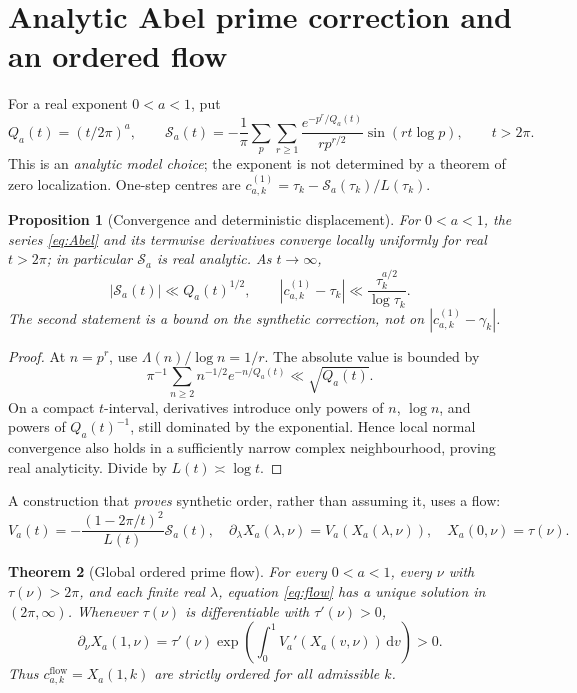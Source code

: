 \documentclass[11pt,a4paper]{article}
\numberwithin{equation}{section}
\newtheorem{theorem}{Theorem}[section]
\newtheorem{proposition}[theorem]{Proposition}
\begin{document}
\section{Analytic Abel prime correction and an ordered flow}
For a real exponent $0<a<1$, put
\begin{equation}\label{eq:Abel}
Q_a(t)=(t/2\pi)^a,\qquad
\mathcal S_a(t)=-\frac1\pi\sum_p\sum_{r\ge1}
\frac{e^{-p^r/Q_a(t)}}{r p^{r/2}}\sin(rt\log p),\qquad t>2\pi.
\end{equation}
This is an \emph{analytic model choice}; the exponent is not determined by a theorem of zero localization. One-step centres are $c_{a,k}^{(1)}=\tau_k-\mathcal S_a(\tau_k)/L(\tau_k)$.
\begin{proposition}[Convergence and deterministic displacement]\label{prop:Abel}
For $0<a<1$, the series \eqref{eq:Abel} and its termwise derivatives converge locally uniformly for real $t>2\pi$; in particular $\mathcal S_a$ is real analytic. As $t\to\infty$,
\begin{equation}\label{eq:Abelbound}
|\mathcal S_a(t)|\ll Q_a(t)^{1/2},\qquad
|c_{a,k}^{(1)}-\tau_k|\ll \frac{\tau_k^{a/2}}{\log\tau_k}.
\end{equation}
The second statement is a bound on the \emph{synthetic correction}, not on $|c_{a,k}^{(1)}-\gamma_k|$.
\end{proposition}
\begin{proof}
At $n=p^r$, use $\Lambda(n)/\log n=1/r$. The absolute value is bounded by
\[\pi^{-1}\sum_{n\ge2}n^{-1/2}e^{-n/Q_a(t)}\ll\sqrt{Q_a(t)}.\]
On a compact $t$-interval, derivatives introduce only powers of $n$, $\log n$, and powers of $Q_a(t)^{-1}$, still dominated by the exponential. Hence local normal convergence also holds in a sufficiently narrow complex neighbourhood, proving real analyticity. Divide by $L(t)\asymp\log t$.
\end{proof}
A construction that \emph{proves} synthetic order, rather than assuming it, uses a flow:
\begin{equation}\label{eq:flow}
V_a(t)=-\frac{(1-2\pi/t)^2}{L(t)}\mathcal S_a(t),\quad
\partial_\lambda X_a(\lambda,\nu)=V_a(X_a(\lambda,\nu)),\quad
X_a(0,\nu)=\tau(\nu).
\end{equation}
\begin{theorem}[Global ordered prime flow]\label{thm:flow}
For every $0<a<1$, every $\nu$ with $\tau(\nu)>2\pi$, and each finite real $\lambda$, equation \eqref{eq:flow} has a unique solution in $(2\pi,\infty)$. Whenever $\tau(\nu)$ is differentiable with $\tau'(\nu)>0$,
\begin{equation}\label{eq:flowderivative}
\partial_\nu X_a(1,\nu)=\tau'(\nu)
\exp\!\left(\int_0^1V_a'(X_a(v,\nu))\,\mathrm dv\right)>0.
\end{equation}
Thus $c_{a,k}^{\mathrm{flow}}=X_a(1,k)$ are strictly ordered for all admissible $k$.
\end{theorem}
\end{document}
